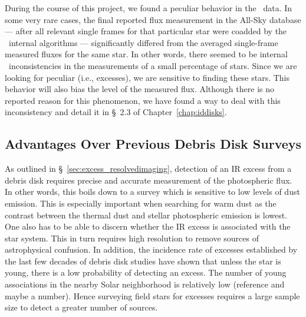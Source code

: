     During the course of this project, we found a peculiar behavior in the \WS\ data. In some very rare cases, the final reported flux measurement in the All-Sky database --- after all relevant single frames for that particular star were coadded by the \WS\ internal algorithms --- significantly differed from the averaged single-frame measured fluxes for the same star. In other words, there seemed to be internal \WS\ inconsistencies in the measurements of a small percentage of stars. Since we are looking for peculiar (i.e., excesses), we are sensitive to finding these stars. This behavior will also bias the level of the measured flux. Although there is no reported reason for this phenomenon, we have found a way to deal with this inconsistency and detail it in \S~2.3 of Chapter~\ref{chap:iddisks}. 
    

    \subsection{Advantages Over Previous Debris Disk Surveys}

    As outlined in \S~\ref{sec:excess_resolvedimaging}, detection of an IR excess from a debris disk requires precise and accurate measurement of the photospheric flux. In other words, this boils down to a survey which is sensitive to low levels of dust emission. This is especially important when searching for warm dust as the contrast between the thermal dust and stellar photospheric emission is lowest. One also has to be able to discern whether the IR excess is associated with the star system. This in turn requires high resolution to remove sources of astrophysical confusion. In addition, the incidence rate of excesses established by the last few decades of debris disk studies have shown that unless the star is young, there is a low probability of detecting an excess. The number of young associations in the nearby Solar neighborhood is relatively low (reference and maybe a number). Hence surveying field stars for excesses requires a large sample size to detect a greater number of sources. 
    
